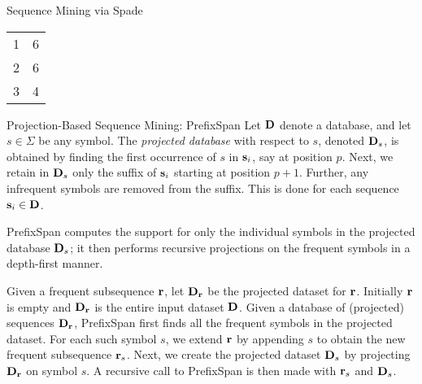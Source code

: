 \begin{frame}{Sequence Mining via Spade}
{{\begin{tabular}{|c|c|}
        1 & 6\\
        2 & 6\\
        3 & 4\\
        \hline
    \end{tabular}}
  }
  \centerline{
  }
\end{frame}


\begin{frame}{Projection-Based Sequence Mining: Pref\/{i}xSpan}
Let $\mathbf{D}$ denote a database, and let $s \in \Sigma$ be any
symbol. The {\em projected database} with respect to $s$, denoted
$\mathbf{D}_s$, is obtained by f\/{i}nding the
f\/{i}rst occurrence of $s$ in $\mathbf{s}_i$, say at position $p$. Next,
we retain in $\mathbf{D}_s$ only the suff\/{i}x of $\mathbf{s}_i$
starting at position $p+1$.  Further, any infrequent
symbols are removed from the suff\/{i}x.
This is done for each sequence
$\mathbf{s}_i \in \mathbf{D}$.

\medskip
Pref\/{i}xSpan computes the support for only the
individual symbols in the projected database $\mathbf{D}_s$; it then
performs recursive projections on the
frequent symbols in a depth-f\/{i}rst manner. 

\medskip
Given a frequent subsequence $\mathbf{r}$, let $\mathbf{D}_{\mathbf{r}}$ be the projected
dataset for $\mathbf{r}$. Initially $\mathbf{r}$ is empty and $\mathbf{D}_{\mathbf{r}}$ is the entire
input dataset $\mathbf{D}$.
Given a database of (projected) sequences $\mathbf{D}_{\mathbf{r}}$,
Pref\/{i}xSpan f\/{i}rst f\/{i}nds all the frequent symbols in the projected
dataset. For each such symbol $s$, we extend $\mathbf{r}$ by appending $s$
to obtain the new frequent subsequence $\mathbf{r}_s$. Next, we create the
projected dataset $\mathbf{D}_s$ by projecting $\mathbf{D}_{\mathbf{r}}$ on
symbol $s$. A recursive call to Pref\/{i}xSpan is
then made with $\mathbf{r}_s$ and $\mathbf{D}_s$.
\end{frame}


